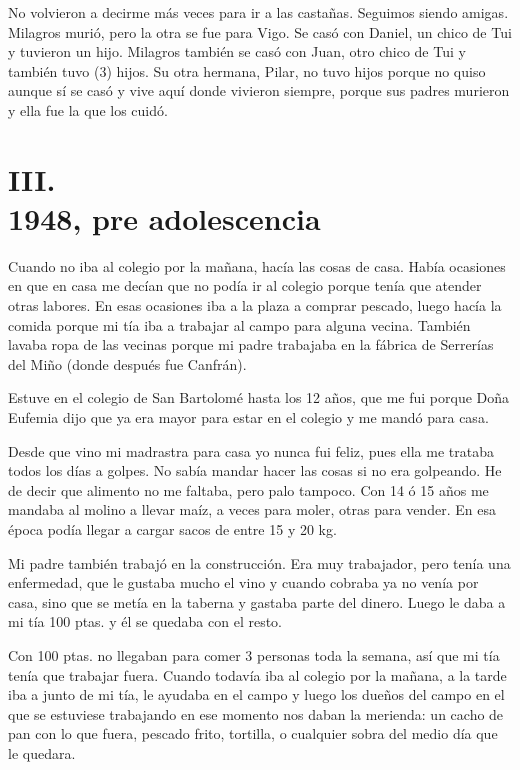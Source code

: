 \documentclass[12pt,a5paper]{book}
\begin{document}
No volvieron a decirme más veces para ir a las castañas. Seguimos siendo amigas. Milagros murió, pero la otra se fue para Vigo. Se casó con Daniel, un chico de Tui y tuvieron un hijo. Milagros también se casó con Juan, otro chico de Tui y también tuvo (3) hijos. Su otra hermana, Pilar, no tuvo hijos porque no quiso aunque sí se casó y vive aquí donde vivieron siempre, porque sus padres murieron y ella fue la que los cuidó.



\section*{III.\\1948, pre adolescencia}

Cuando no iba al colegio por la mañana, hacía las cosas de casa. Había ocasiones en que en casa me decían que no podía ir al colegio porque tenía que atender otras labores. En esas ocasiones iba a la plaza a comprar pescado, luego hacía la comida porque mi tía iba a trabajar al campo para alguna vecina. También lavaba ropa de las vecinas porque mi padre trabajaba en la fábrica de Serrerías del Miño (donde después fue Canfrán). 

Estuve en el colegio de San Bartolomé hasta los 12 años, que me fui porque Doña Eufemia dijo que ya era mayor para estar en el colegio y me mandó para casa.

Desde que vino mi madrastra para casa yo nunca fui feliz, pues ella me trataba todos los días a golpes. No sabía mandar hacer las cosas si no era golpeando. He de decir que alimento no me faltaba, pero palo tampoco.
Con 14 ó 15 años me mandaba al molino a llevar maíz, a veces para moler, otras para vender. En esa época podía llegar a cargar sacos de entre 15 y 20 kg.

Mi padre también trabajó en la construcción. Era muy trabajador, pero tenía una enfermedad, que le gustaba mucho el vino y cuando cobraba ya no venía por casa, sino que se metía en la taberna y gastaba parte del dinero. Luego le daba a mi tía 100 ptas. y él se quedaba con el resto.

Con 100 ptas. no llegaban para comer 3 personas toda la semana, así que mi tía tenía que trabajar fuera. Cuando todavía iba al colegio por la mañana, a la tarde iba a junto de mi tía, le ayudaba en el campo y luego los dueños del campo en el que se estuviese trabajando en ese momento nos daban la merienda: un cacho de pan con lo que fuera, pescado frito, tortilla, o cualquier sobra del medio día que le quedara.
\end{document}
